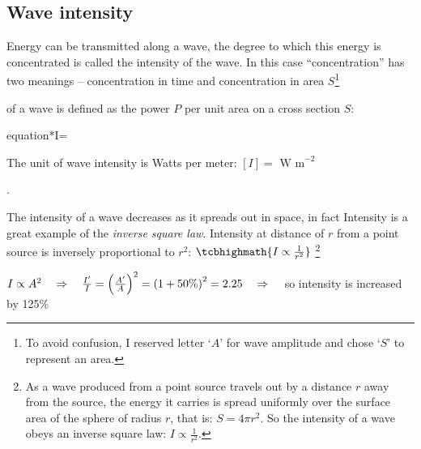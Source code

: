 	

\subsection{Wave intensity}

Energy can be transmitted along a wave, the degree to which this energy is concentrated is called the intensity of the wave. In this case ``concentration'' has two meanings -- concentration in time and concentration in area $S$\footnote{To avoid confusion, I reserved letter `$A$' for wave amplitude and chose `$S$' to represent an area.}

\begin{ilight}
	\centering {} of a wave is defined as the power $P$ per unit area on a cross section $S$: \begin{empheq}[box=\tcbhighmath]{equation*}{I=}\end{empheq}
\end{ilight}

The unit of wave intensity is Watts per meter: $[I] = \text{ W m}^{-2}$

.

The intensity of a wave decreases as it spreads out in space, in fact Intensity is a great example of the \emph{inverse square law}. Intensity at distance of $r$ from a point source is inversely proportional to $r^2$: $\tcbhighmath{I \propto \frac{1}{r^2}}$
\footnote{As a wave produced from a point source travels out by a distance $r$ away from the source, the energy it carries is spread uniformly over the surface area of the sphere of radius $r$, that is: $S=4\pi r^2$. So the intensity of a wave obeys an inverse square law: $I \propto \frac{1}{r^2}$.}


\begin{soln} $I \propto A^2 \quad \Rightarrow \quad \frac{I'}{I} = \left( \frac{A'}{A} \right)^2 = \left( 1 + 50\% \right)^2 =2.25 \quad \Rightarrow \quad $ so intensity is increased by 125\% \end{soln}


